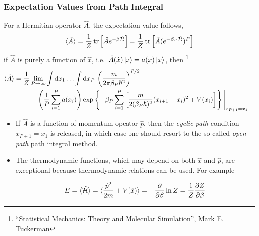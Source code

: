 \begin{frame}
  \frametitle{Expectation Values from Path Integral}
  For a Hermitian operator $\hat{A}$, the expectation value follows,
  \begin{equation*}
    \braket{\hat{A}} = \frac{1}{Z} \operatorname{tr}\left[\hat{A}e^{-\beta\hat{\cal H}}\right]
    = \frac{1}{Z} \operatorname{tr}\left[\hat{A}(e^{-{\beta_P}\hat{\cal H}})^P\right]
  \end{equation*}
  if $\hat{A}$ is purely a function of $\hat{x}$, i.e.\ $\hat{A}(\hat{x})\ket{x}
  = a(x)\ket{x}$, then
  \footnote{
   ``Statistical Mechanics: Theory and Molecular Simulation'', Mark E. Tuckerman 
  }
  \begin{align*}
    \braket{\hat{A}} &=
                       \frac{1}{Z}
                       \lim_{P\to\infty}
                       \int\dt{x_1}\ldots\int\dt{x_P}\,
                       \left(m \over2\pi\beta_P\hbar^2\right)^{P/2} \cr
    &\phantom{
                       \frac{1}{Z}
                       \lim_{P\to\infty}
                       } 
        \left( {1\over P}\sum_{i=1}^P a(x_i) \right)
        \exp\left\{
          \displaystyle
          -\beta_P
          \sum_{i=1}^P \left[
            {m\over2(\beta_P\hbar)^2} (x_{\tikzmark{ring_polymer_bc} i+1} - x_i)^2
            +
            V(x_i)
          \right]
        \right\} \Bigg|_{x_{P+1} = x_1}
  \end{align*}

  \begin{itemize}
  \item If $\hat{A}$ is a function of momentum opeator $\hat{p}$, then the
    \emph{cyclic-path} condition $x_{P+1} = x_1$ is released, in which case one should resort to
    the so-called \emph{open-path} path integral method.
  \item The thermodynamic functions, which may depend on both $\hat{x}$ and
    $\hat{p}$, are exceptional because thermodynamic relations can be used. For example


    \begin{equation*}
      E = \braket{\hat{\cal H}} = \braket{\frac{\hat{p}^2}{2m} + V(\hat{x})} 
      = -{\partial\over\partial\beta}\ln Z = {1\over Z}{\partial Z\over\partial\beta}
    \end{equation*}
  \end{itemize}
\end{frame}
